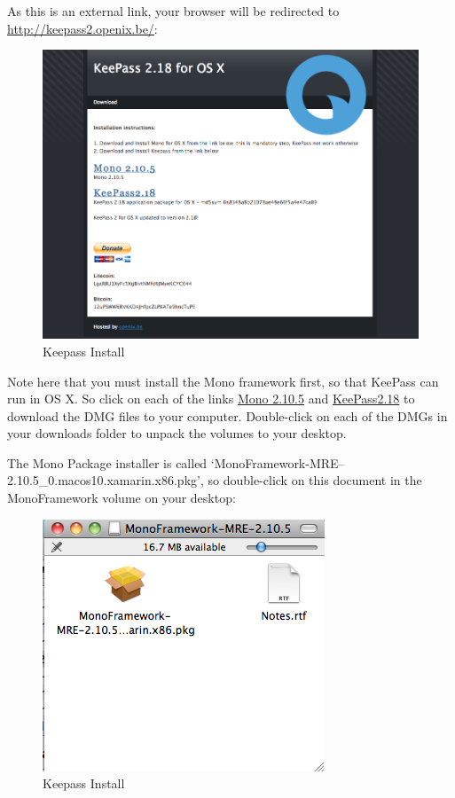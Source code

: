 As this is an external link, your browser will be redirected to
\href{http://keepass2.openix.be/}{http://keepass2.openix.be/}:

\begin{figure}[htbp]
\centering
\includegraphics{keepass_10.png}
\caption{Keepass Install}
\end{figure}

Note here that you must install the Mono framework first, so that
KeePass can run in OS X. So click on each of the links
\href{http://download.mono-project.com/archive/2.10.5/macos-10-x86/0/MonoFramework-MRE-2.10.5\_0.macos10.xamarin.x86.dmg}{Mono
2.10.5} and
\href{http://keepass2.openix.be/KeePass2.18.dmg}{KeePass2.18} to
download the DMG files to your computer. Double-click on each of the
DMGs in your downloads folder to unpack the volumes to your desktop.

The Mono Package installer is called
`MonoFramework-MRE--2.10.5\_0.macos10.xamarin.x86.pkg', so double-click
on this document in the MonoFramework volume on your desktop:

\begin{figure}[htbp]
\centering
\includegraphics{keepass_11.png}
\caption{Keepass Install}
\end{figure}

